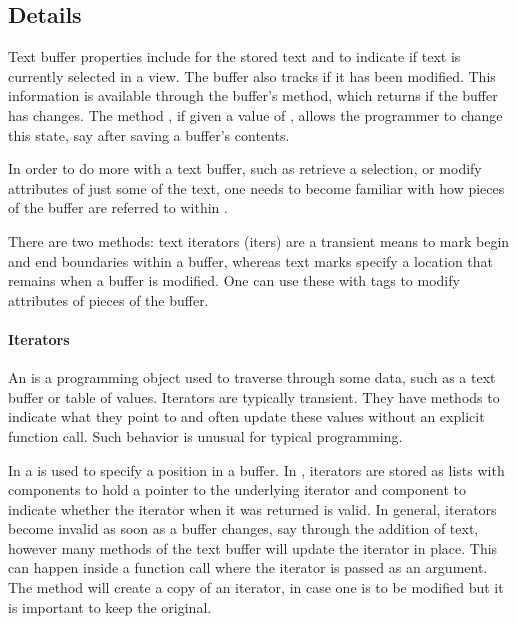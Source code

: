 \subsection{ Details}
\label{sec:RGtk2:text-buffers}

Text buffer properties include  for
the stored text and  to indicate if text is
currently selected in a view. The buffer also tracks if it has been
modified. This information is available through the buffer's
 method, which returns 
if the buffer has changes. The method
, if given a value of ,
allows the programmer to change this state, say after saving a
buffer's contents.

In order to do more with a text buffer, such as retrieve a selection,
or modify attributes of just some of the text, one needs to become
familiar with how pieces of the buffer are referred to within \GTK.

There are two methods: text iterators (iters) are a transient means to
mark begin and end boundaries within a buffer, whereas text marks
specify a location that remains when a buffer is modified. One can use
these with tags to modify attributes of pieces of the buffer.


\paragraph{Iterators}


An  is a programming object used to traverse through
some data, such as a text buffer or table of values. Iterators are
typically transient. They have
methods to indicate what they point to and often update these
values without an explicit function call. Such behavior is unusual
for typical \R\/ programming.


In \GTK{} a  is used to specify a position in a
buffer.  In , iterators are stored as lists with components
 to hold a pointer to the underlying iterator and component
 to indicate whether the iterator when it was returned is
valid. In general, iterators become invalid as soon as a buffer
changes, say through the addition of text, however many methods of the
text buffer will update the iterator in place. This can happen inside
a function call where the iterator is passed as an argument. The
 method will create a copy of an iterator,
in case one is to be modified but it is important to keep the
original.

